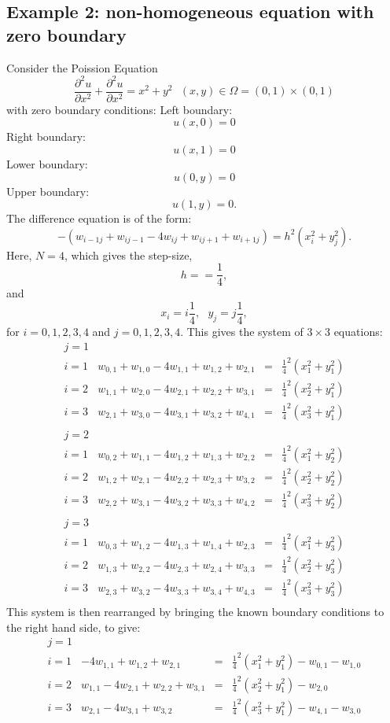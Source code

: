 \subsection{Example 2: non-homogeneous equation with zero boundary}
Consider the Poission Equation
\[ \frac{\partial^2 u}{\partial x^2}+\frac{\partial^2 u}{\partial x^2}=x^2+y^2 \ \ \ (x,y) \in \Omega=(0,1)\times (0,1) \]
with zero boundary conditions:
Left boundary:
\[u(x,0) =0 \]
Right boundary:
\[u(x,1) = 0  \]
Lower boundary:
\[u(0,y) = 0 \]
Upper boundary:
\[u(1,y) =  0. \]
The difference equation is of the form:
\[-(w_{i-1j}+w_{ij-1}-4w_{ij}+w_{ij+1}+w_{i+1j})=h^2(x_i^2+y_j^2). \]
Here, $N=4$, which gives the step-size,
\[h==\frac{1}{4},\]
and
\[x_i=i\frac{1}{4}, \ \ \ y_j=j\frac{1}{4},\]
for $i=0,1,2,3,4$ and $j=0,1,2,3,4$.
This gives the system of $3\times 3$ equations:
\[\begin{array}{l|rcl}
j=1\\
i=1&w_{0,1}+w_{1,0}-4w_{1,1}+w_{1,2}+w_{2,1}&=&\frac{1}{4}^2(x_1^2+y_1^2)\\
i=2&w_{1,1}+w_{2,0}-4w_{2,1}+w_{2,2}+w_{3,1}&=&\frac{1}{4}^2(x_2^2+y_1^2)\\
i=3&w_{2,1}+w_{3,0}-4w_{3,1}+w_{3,2}+w_{4,1}&=&\frac{1}{4}^2(x_3^2+y_1^2)\\
\end{array}
\]	
\[\begin{array}{l|rcl}
j=2\\
i=1&w_{0,2}+w_{1,1}-4w_{1,2}+w_{1,3}+w_{2,2}&=&\frac{1}{4}^2(x_1^2+y_2^2)\\
i=2&w_{1,2}+w_{2,1}-4w_{2,2}+w_{2,3}+w_{3,2}&=&\frac{1}{4}^2(x_2^2+y_2^2)\\
i=3&w_{2,2}+w_{3,1}-4w_{3,2}+w_{3,3}+w_{4,2}&=&\frac{1}{4}^2(x_3^2+y_2^2)\\
\end{array}
\]	
\[\begin{array}{l|rcl}
j=3\\
i=1&w_{0,3}+w_{1,2}-4w_{1,3}+w_{1,4}+w_{2,3}&=&\frac{1}{4}^2(x_1^2+y_3^2)\\
i=2&w_{1,3}+w_{2,2}-4w_{2,3}+w_{2,4}+w_{3,3}&=&\frac{1}{4}^2(x_2^2+y_3^2)\\
i=3&w_{2,3}+w_{3,2}-4w_{3,3}+w_{3,4}+w_{4,3}&=&\frac{1}{4}^2(x_3^2+y_3^2)\\
\end{array}
\]	
This  system  is  then  rearranged  by  bringing  the  known  boundary conditions to the right hand side, to give:
\[\begin{array}{l|rcl}

j=1\\
i=1&-4w_{1,1}+w_{1,2}+w_{2,1}&=&\frac{1}{4}^2(x_1^2+y_1^2)-w_{0,1}-w_{1,0}\\
i=2&w_{1,1}-4w_{2,1}+w_{2,2}+w_{3,1}&=&\frac{1}{4}^2(x_2^2+y_1^2)-w_{2,0}\\
i=3&w_{2,1}-4w_{3,1}+w_{3,2}&=&\frac{1}{4}^2(x_3^2+y_1^2)-w_{4,1}-w_{3,0}\\
\end{array}
\]	
